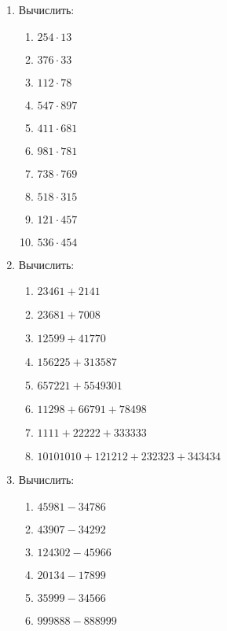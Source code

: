 \documentclass[12pt, a4paper]{article}
\begin{document}
\begin{enumerate}
\begin{multicols}{5}
\begin{enumerate}
			\item $53\cdot35$
			\item $69\cdot41$
			\item $58\cdot11$
			\item $39\cdot47$
			\item $12\cdot19$
			\item $99\cdot88$
			\item $26\cdot34$
		\end{enumerate}
	\end{multicols}
	\item Вычислить:
	\begin{multicols}{5}
		\begin{enumerate}
			\item $254\cdot13$
			\item $376\cdot33$
			\item $112\cdot78$
			\item $547\cdot897$
			\item $411\cdot681$
			\item $981\cdot781$
			\item $738\cdot769$
			\item $518\cdot315$
			\item $121\cdot457$
			\item $536\cdot454$
		\end{enumerate}
	\end{multicols}
	\item Вычислить:
	\begin{multicols}{2}
		\begin{enumerate}
			\item $23461+2141$
			\item $23681+7008$
			\item $12599+41770$
			\item $156225+313587$
			\item $657221+5549301$
			\item $11298+66791+78498$
			\item $1111+22222+333333$
			\item $10101010+121212+232323+343434$
		\end{enumerate}
	\end{multicols}
	\item Вычислить:
	\begin{multicols}{2}
		\begin{enumerate}
			\item $45981-34786$
			\item $43907-34292$
			\item $124302-45966$
			\item $20134-17899$
			\item $35999-34566$
			\item $999888-888999$
		\end{enumerate}
	\end{multicols}
\end{enumerate}
\end{document}
